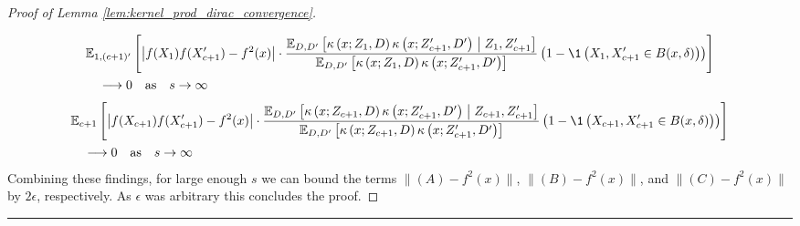 \begin{proof}[Proof of Lemma \ref{lem:kernel_prod_dirac_convergence}]
\begin{equation}
\begin{aligned}
        \end{aligned}
    \end{equation}
    \begin{equation}
        \begin{aligned}
            & \E_{1, (c+1)^{\prime}}\left[
                \left| f(X_{1}) f(X_{c+1}^{\prime}) - f^{2}(x)\right|
                \cdot \frac{\E_{D, D^{\prime}}\left[\kappa\left(x; Z_{1}, D\right)\kappa\left(x; Z_{c+1}^{\prime}, D^{\prime}\right) \; \middle| \; Z_{1}, Z_{c+1}^{\prime}\right]}{\E_{D, D^{\prime}}\left[\kappa\left(x; Z_{1}, D\right)\kappa\left(x; Z_{c+1}^{\prime}, D^{\prime}\right)\right]}
                \left(1 - \1\left(X_1, X_{c+1}^{\prime} \in B(x, \delta)\right)\right)
            \right]\\
            & \quad \longrightarrow 0 \quad \text{as} \quad s \rightarrow \infty
        \end{aligned}
    \end{equation}
    \begin{equation}
        \begin{aligned}
            & \E_{c+1}\left[
                \left|f(X_{c+1}) f(X_{c+1}^{\prime}) - f^{2}(x)\right|
                \cdot \frac{\E_{D, D^{\prime}}\left[\kappa\left(x; Z_{c+1}, D\right)\kappa\left(x; Z_{c+1}^{\prime}, D^{\prime}\right) \; \middle| \; Z_{c+1}, Z_{c+1}^{\prime}\right]}{\E_{D, D^{\prime}}\left[\kappa\left(x; Z_{c+1}, D\right)\kappa\left(x; Z_{c+1}^{\prime}, D^{\prime}\right)\right]} 
                \left(1 - \1\left(X_{c+1}, X_{c+1}^{\prime} \in B(x, \delta)\right)\right)
            \right]\\
            & \quad \longrightarrow 0 \quad \text{as} \quad s \rightarrow \infty
        \end{aligned}
    \end{equation}
    Combining these findings, for large enough $s$ we can bound the terms $\|(A) - f^{2}(x)\|$, $\|(B) - f^{2}(x)\|$, and $\|(C) - f^{2}(x)\|$ by $2\epsilon$, respectively.
    As $\epsilon$ was arbitrary this concludes the proof.
\end{proof}

\hrule

